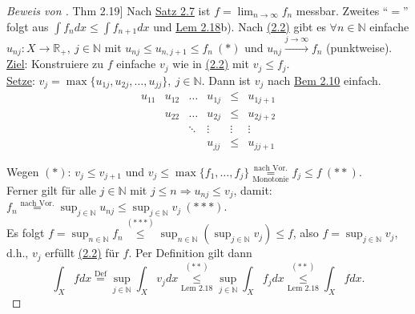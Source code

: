 \documentclass[a4paper]{scrreprt}
\newcommand{\R}{\mathbb{R}}
\newcommand{\N}{\mathbb{N}}
\newcommand{\toInf}{\rightarrow \infty}
\newcommand{\limToInf}[1]{\lim_{#1 \toInf}}
\newcommand{\overunderset}[3]{\overset{#1}{\underset{#3}{#2}}}
\newcommand{\jshortlink}[1]{\jhyperref{#1}{\text{#1}}}
\newcommand{\jhyperref}[2]{\hyperref[j_#1]{#2}}
\newcommand{\jlink}[1]{\jhyperref{#1}{#1}}
\newcommand{\jabb}[3]{ #1: #2 \rightarrow #3 }
\theoremstyle{plain}
\theoremstyle{definition}
\begin{document}
{{{\begin{proof}[Beweis von \jlink{Thm 2.19}]
    Nach \jlink{Satz 2.7} ist $f = \limToInf{n} f_n$ messbar. Zweites ``$=$'' folgt aus $\int f_n dx \le \int f_{n+1} dx$ und \jlink{Lem 2.18}b). Nach \jlink{(2.2)} gibt es $\forall n\in\N$ einfache $\jabb{u_{nj}}{X}{\R_+}, \ j\in\N$ mit $u_{nj} \le u_{n,j+1} \le f_n \ (*)$ und $u_{nj} \xrightarrow{j\rightarrow \infty} f_n$ (punktweise).\\
    \uline{Ziel}: Konstruiere zu $f$ einfache $v_j$ wie in \jlink{(2.2)} mit $v_j \le f_j$.\\
    \uline{Setze}: $v_j = \max \{u_{1j}, u_{2j},\dots, u_{jj}\}, \ j\in\N$. Dann ist $v_j$ nach \jlink{Bem 2.10} einfach.
    \[
        \begin{matrix}
            u_{11} & u_{12} & \dots  & u_{1j} & \le    & u_{1j+1} \\
                   & u_{22} & \dots  & u_{2j} & \le    & u_{2j+2} \\
                   &        & \ddots & \vdots & \vdots & \vdots   \\
                   &        &        & u_{jj} & \le    & u_{jj+1} 
        \end{matrix}
    \]
    
    Wegen $(*)$: $v_j\le v_{j+1}$ und $v_j \le \max \{f_1, \dots, f_j\} \overset{\text{nach Vor.}}{\underset{\text{Monotonie}}{=}} f_j \le f \ (**)$.\\
    Ferner gilt für alle $j\in\N$ mit $j\le n \Rightarrow u_{nj} \le v_j$, damit:\\
    $f_n \overset{\text{nach Vor.}}{=} \sup_{j\in\N} u_{nj} \le \sup_{j\in\N} v_j \ (***)$.\\
    Es folgt $f = \sup_{n\in\N} f_n \overset{(***)}{\le} \sup_{n\in\N} (\sup_{j\in\N} v_j) \le f$, also $f=\sup_{j\in\N} v_j$, d.h., $v_j$ erfüllt \jlink{(2.2)} für $f$. Per Definition gilt dann
    \begin{displaymath}
        \int_X f dx \overset{\text{Def}}{=} \sup_{j\in\N} \int_X v_j dx \overset{(**)}{\underset{\jshortlink{Lem 2.18}}{\le}} \sup_{j\in\N} \int_X f_j dx \overunderset{(**)}{\le}{\jshortlink{Lem 2.18}} \int_X f dx.
    \end{displaymath}
\end{proof}


}}}
\end{document}
